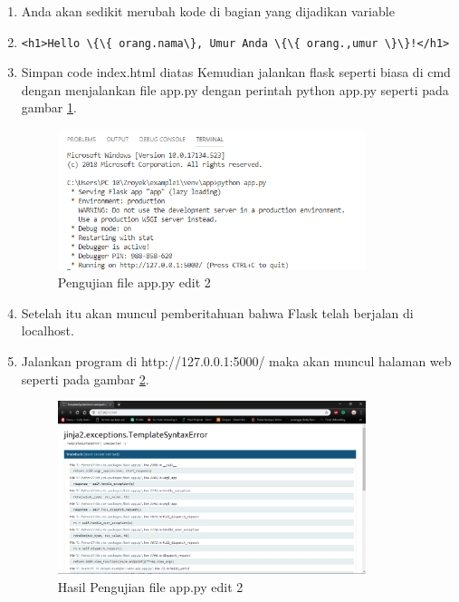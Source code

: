 \begin{enumerate}
\item Anda akan sedikit merubah kode di bagian yang dijadikan variable 
\item \verb|<h1>Hello \{\{ orang.nama\}, Umur Anda \{\{ orang.,umur \}\}!</h1>|
\item Simpan code index.html diatas Kemudian jalankan flask seperti biasa di cmd dengan menjalankan file app.py dengan perintah python app.py seperti pada gambar \ref{fig:ufae}.
\begin{figure}[!htbp]
	\centerline{\includegraphics[width=0.85\textwidth]{figures/13/ufae.PNG}}
	\caption{Pengujian file app.py edit 2}
	\label{fig:ufae}
\end{figure}

\item Setelah itu akan muncul pemberitahuan bahwa Flask telah berjalan di localhost.
\item Jalankan program di http://127.0.0.1:5000/ maka akan muncul halaman web seperti pada gambar \ref{fig:hufae}.
\begin{figure}[!htbp]
	\centerline{\includegraphics[width=0.85\textwidth]{figures/13/hufae.PNG}}
	\caption{Hasil Pengujian file app.py edit 2}
	\label{fig:hufae}
\end{figure}


\end{enumerate}
